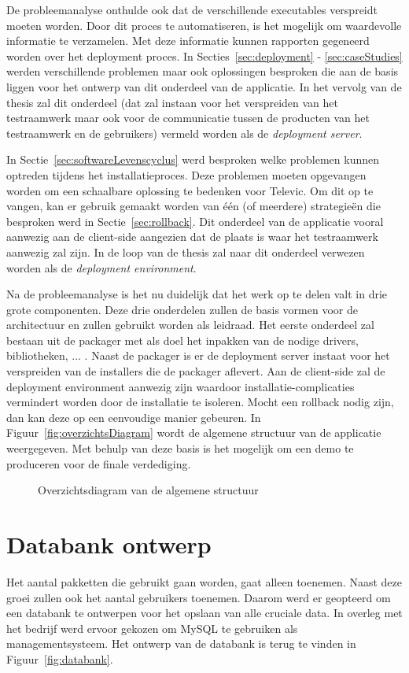 De probleemanalyse onthulde ook dat de verschillende executables verspreidt moeten worden.
Door dit proces te automatiseren, is het mogelijk om waardevolle informatie te verzamelen.
Met deze informatie kunnen rapporten gegeneerd worden over het deployment proces.
In Secties~\ref{sec:deployment} - \ref{sec:caseStudies} werden verschillende problemen maar ook oplossingen besproken die aan de basis liggen voor het ontwerp van dit onderdeel van de applicatie. 
In het vervolg van de thesis zal dit onderdeel (dat zal instaan voor het verspreiden van het testraamwerk maar ook voor de communicatie tussen de producten van het testraamwerk en de gebruikers) vermeld worden als de \emph{deployment server}.

In Sectie~\vref{sec:softwareLevenscyclus} werd besproken welke problemen kunnen optreden tijdens het installatieproces.
Deze problemen moeten opgevangen worden om een schaalbare oplossing te bedenken voor Televic.
Om dit op te vangen, kan er gebruik gemaakt worden van één (of meerdere) strategieën die besproken werd in Sectie~\vref{sec:rollback}.
Dit onderdeel van de applicatie vooral aanwezig aan de client-side aangezien dat de plaats is waar het testraamwerk aanwezig zal zijn.
In de loop van de thesis zal naar dit onderdeel verwezen worden als de \emph{deployment environment}.

Na de probleemanalyse is het nu duidelijk dat het werk op te delen valt in drie grote componenten.
Deze drie onderdelen zullen de basis vormen voor de architectuur en zullen gebruikt worden als leidraad.
Het eerste onderdeel zal bestaan uit de packager met als doel het inpakken van de nodige drivers, bibliotheken, ... .
Naast de packager is er de deployment server instaat voor het verspreiden van de installers die de packager aflevert.
Aan de client-side zal de deployment environment aanwezig zijn waardoor installatie-complicaties vermindert worden door de installatie te isoleren.
Mocht een rollback nodig zijn, dan kan deze op een eenvoudige manier gebeuren.
In Figuur~\vref{fig:overzichtsDiagram} wordt de algemene structuur van de applicatie weergegeven.
Met behulp van deze basis is het mogelijk om een demo te produceren voor de finale verdediging.

\begin{figure}[!hbt]
\centering
  
  \caption{Overzichtsdiagram van de algemene structuur}
  \label{fig:overzichtsDiagram}
\end{figure}

\section{Databank ontwerp}\label{sec:databank}
Het aantal pakketten die gebruikt gaan worden, gaat alleen toenemen.
Naast deze groei zullen ook het aantal gebruikers toenemen.
Daarom werd er geopteerd om een databank te ontwerpen voor het opslaan van alle cruciale data.
In overleg met het bedrijf werd ervoor gekozen om MySQL te gebruiken als managementsysteem.
Het ontwerp van de databank is terug te vinden in Figuur~\vref{fig:databank}.

